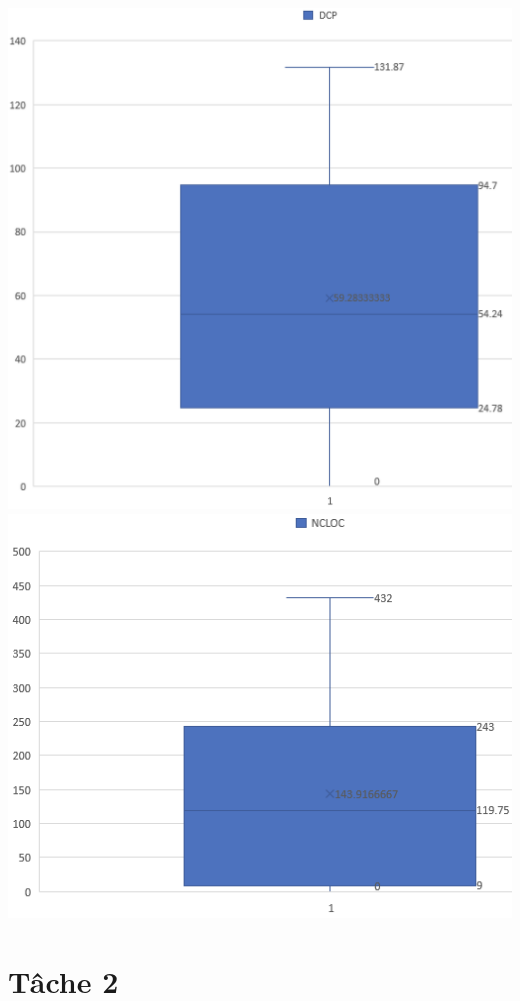 \documentclass{article}
\begin{document}
\includegraphics[scale=0.5]{DCP.png}\\
\includegraphics[scale=0.6]{NCLOC.png}


\section*{Tâche 2}\\
\end{document}
